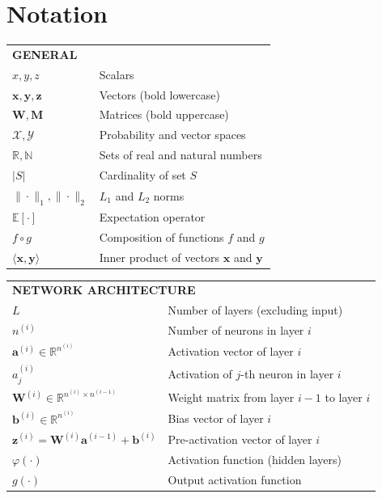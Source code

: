 \chapter*{Notation}

\begin{longtable}[l]{ll} %
\multicolumn{2}{l}{\textbf{GENERAL}} \\[0.3em]
$x, y, z$ & Scalars \\
$\mathbf{x}, \mathbf{y}, \mathbf{z}$ & Vectors (bold lowercase) \\
$\mathbf{W}, \mathbf{M}$ & Matrices (bold uppercase) \\
$\mathcal{X}, \mathcal{Y}$ & Probability and vector spaces  \\
$\mathbb{R}, \mathbb{N}$ & Sets of real and natural numbers \\
$|S|$ & Cardinality of set $S$ \\
$\|\cdot\|_1, \|\cdot\|_2$ & $L_1$ and $L_2$ norms \\
$\mathbb{E}[\cdot]$ & Expectation operator \\
$f \circ g$ & Composition of functions $f$ and $g$ \\
$\langle \mathbf{x}, \mathbf{y} \rangle$ & Inner product of vectors $\mathbf{x}$ and $\mathbf{y}$
\end{longtable}

\begin{longtable}{p{} p{}}
\multicolumn{2}{l}{\textbf{NETWORK ARCHITECTURE}} \\[0.3em]
$L$ & Number of layers (excluding input) \\
$n^{(i)}$ & Number of neurons in layer $i$ \\
$\mathbf{a}^{(i)} \in \mathbb{R}^{n^{(i)}}$ & Activation vector of layer $i$ \\
$a^{(i)}_j$ & Activation of $j$-th neuron in layer $i$ \\
$\mathbf{W}^{(i)} \in \mathbb{R}^{n^{(i)} \times n^{(i-1)}}$ & Weight matrix from layer $i-1$ to layer $i$ \\
$\mathbf{b}^{(i)} \in \mathbb{R}^{n^{(i)}}$ & Bias vector of layer $i$ \\
$\mathbf{z}^{(i)} = \mathbf{W}^{(i)} \mathbf{a}^{(i-1)} + \mathbf{b}^{(i)}$ & Pre-activation vector of layer $i$ \\
$\varphi(\cdot)$ & Activation function (hidden layers) \\
$g(\cdot)$ & Output activation function
\end{longtable}


